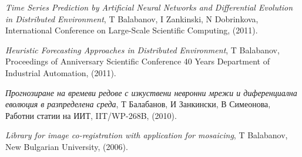 \documentclass[bulgarian,a4paper]{europasscv}
\begin{document}
\begin{europasscv}
{\begin{ecvitemize}
    \item \textit{Time Series Prediction by Artificial Neural Networks and Differential Evolution in Distributed Environment}, T Balabanov, I Zankinski, N Dobrinkova, International Conference on Large-Scale Scientific Computing, (2011).
    \item \textit{Heuristic Forecasting Approaches in Distributed Environment}, T Balabanov, Proceedings of Anniversary Scientific Conference 40 Years Department of Industrial Automation, (2011).
    \item \textit{Прогнозиране на времеви редове с изкуствени невронни мрежи и диференциална еволюция в разпределена среда}, Т Балабанов, И Занкински, В Симеонова, Работни статии на ИИТ, IIT/WP-268B, (2010).
    \item \textit{Library for image co-registration with application for mosaicing}, T Balabanov, New Bulgarian University, (2006).
  \end{ecvitemize}}
  
  \end{europasscv}
\end{document}
